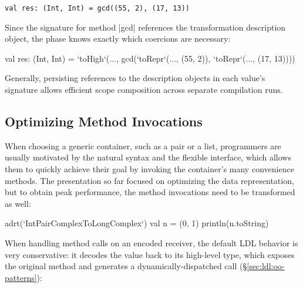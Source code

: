 \vspace{-0.2em}
\begin{lstlisting}
val res: (Int, Int) = gcd((55, 2), (17, 13))
\end{lstlisting}

Since the signature for method |gcd| references the transformation description object, the \coerce{} phase knows exactly which coercions are necessary:

\begin{lstlisting-nobreak}
val res: (Int, Int) = `toHigh`(...,
  gcd(`toRepr`(..., (55, 2)), `toRepr`(..., (17, 13))))
\end{lstlisting-nobreak}

Generally, persisting references to the description objects in each value's signature allows efficient scope composition across separate compilation runs.%


\vspace{-0.5em}
\subsection{Optimizing Method Invocations}
\label{sec:ildl:method}
\vspace{-0.2em}

When choosing a generic container, such as a pair or a list, programmers are usually motivated by the natural syntax and the flexible interface, which allows them to quickly achieve their goal by invoking the container's many convenience methods. The presentation so far focused on optimizing the data representation, but to obtain peak performance, the method invocations need to be transformed as well:

\begin{lstlisting-nobreak}
adrt(`IntPairComplexToLongComplex`) {
  val n = (0, 1)
  println(n.toString)
}
\end{lstlisting-nobreak}

When handling method calls on an encoded receiver, the default LDL behavior is very conservative: it decodes the value back to its high-level type, which exposes the original method and generates a dynamically-dispatched call (\S\ref{sec:ldl:oo-patterns}):

